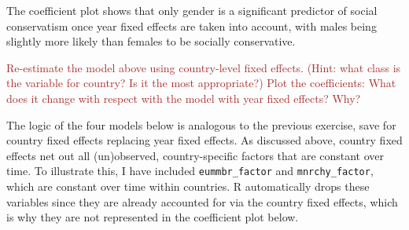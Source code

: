 \documentclass[
]{article}
\begin{document}
The coefficient plot shows that only gender is a significant predictor
of social conservatism once year fixed effects are taken into account,
with males being slightly more likely than females to be socially
conservative.

\textcolor{brown}{Re-estimate the model above using country-level fixed effects. (Hint: what class is the variable for country? Is it the most appropriate?) Plot the coefficients: What does it change with respect with the model with year fixed effects? Why?}

The logic of the four models below is analogous to the previous
exercise, save for country fixed effects replacing year fixed effects.
As discussed above, country fixed effects net out all (un)observed,
country-specific factors that are constant over time. To illustrate
this, I have included \texttt{eummbr\_factor} and
\texttt{mnrchy\_factor}, which are constant over time within countries.
R automatically drops these variables since they are already accounted
for via the country fixed effects, which is why they are not represented
in the coefficient plot below.
\end{document}
